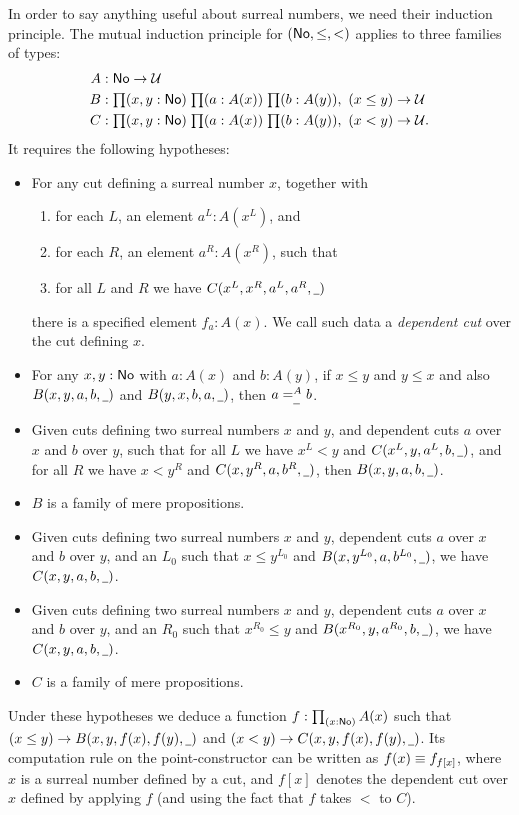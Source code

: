 In order to say anything useful about surreal numbers, we need their induction principle.
The mutual induction principle for $(\NO,\le,<)$ applies to three families of types:
\begin{align*}
  A &: \NO\to\type\\
  B &: \prd{x,y:\NO}{a:A(x)}{b:A(y)} (x\le y) \to \type\\
  C &: \prd{x,y:\NO}{a:A(x)}{b:A(y)} (x<y) \to \type.
\end{align*}
It requires the following hypotheses:
\begin{itemize}
\item For any cut defining a surreal number $x$, together with
  \begin{enumerate}
  \item for each $L$, an element $a^L:A(x^L)$, and
  \item for each $R$, an element $a^R:A(x^R)$, such that
  \item for all $L$ and $R$ we have $C(x^L,x^R,a^L,a^R,\blank)$
  \end{enumerate}
  there is a specified element $f_a:A(x)$.
  We call such data a \emph{dependent cut} over the cut defining $x$.
\item For any $x,y:\NO$ with $a:A(x)$ and $b:A(y)$, if $x\le y$ and $y\le x$ and also $B(x,y,a,b,\blank)$ and $B(y,x,b,a,\blank)$, then $\dpath{A}{\blank}{a}{b}$.
\item Given cuts defining two surreal numbers $x$ and $y$, and dependent cuts $a$ over $x$ and $b$ over $y$, such that for all $L$ we have $x^L<y$ and $C(x^L,y,a^L,b,\blank)$, and for all $R$ we have $x<y^R$ and $C(x,y^R,a,b^R,\blank)$, then $B(x,y,a,b,\blank)$.
\item $B$ is a family of mere propositions.
\item Given cuts defining two surreal numbers $x$ and $y$, dependent cuts $a$ over $x$ and $b$ over $y$, and an $L_0$ such that $x\le y^{L_0}$ and $B(x,y^{L_0},a,b^{L_0},\blank)$, we have $C(x,y,a,b,\blank)$.
\item Given cuts defining two surreal numbers $x$ and $y$, dependent cuts $a$ over $x$ and $b$ over $y$, and an ${R_0}$ such that $x^{R_0}\le y$ and $B(x^{R_0},y,a^{R_0},b,\blank)$, we have $C(x,y,a,b,\blank)$.
\item $C$ is a family of mere propositions.
\end{itemize}
Under these hypotheses we deduce a function $f:\prd{x:\NO} A(x)$ such that $(x\le y) \to B(x,y,f(x),f(y),\blank)$ and $(x< y) \to C(x,y,f(x),f(y),\blank)$.
Its computation rule on the point-constructor can be written as $f(x) \jdeq f_{f[x]}$, where $x$ is a surreal number defined by a cut, and $f[x]$ denotes the dependent cut over $x$ defined by applying $f$ (and using the fact that $f$ takes $<$ to $C$).

